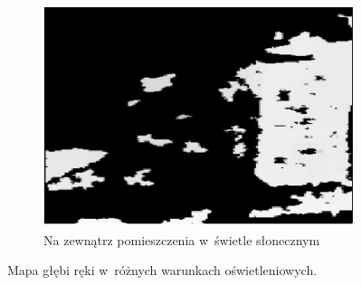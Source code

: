 \begin{savenotes}
\begin{figure}[!htb]
\begin{subfigure}[b]{0.32\textwidth}
			\includegraphics[width=\textwidth]{images/kinecOutdoorFull.png}		
			\caption{Na zewnątrz pomieszczenia w~świetle słonecznym}
			\label{fig:characteristics:kinect:depthMapC}
		\end{subfigure}
																																																			
		\caption[Mapa głębi ręki w~różnych warunkach oświetleniowych]{Mapa głębi ręki w~różnych warunkach oświetleniowych\cite{Suarez2012}.}
		\label{fig:characteristics:kinect:depthMap}
	\end{figure}
\end{savenotes}
																																	
